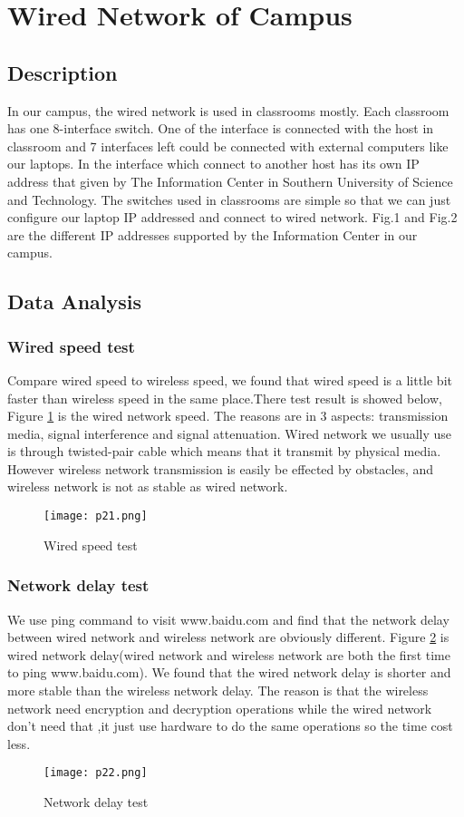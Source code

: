 \documentclass[paper=a4, fontsize=11pt]{scrartcl}
\numberwithin{equation}{section}
\numberwithin{figure}{section}
\numberwithin{table}{section}
\begin{document}
\section{Wired Network of Campus}
\subsection{Description}
In our campus, the wired network is used in classrooms mostly. Each classroom has one 8-interface switch. One of the interface is connected with the host in classroom and 7 interfaces left could be connected with external computers like our laptops. In the interface which connect to another host has its own IP address that given by The Information Center in Southern University of Science and Technology. The switches used in classrooms are simple so that we can just configure our laptop IP addressed and connect to wired network. Fig.1 and Fig.2 are the different IP addresses supported by the Information Center in our campus.
\subsection{Data Analysis}
\subsubsection{Wired speed test}
Compare wired speed to wireless speed, we found that wired speed is a little bit faster than wireless speed in the same place.There test result is showed below, Figure \ref{p21} is the wired network speed. The reasons are in 3 aspects: transmission media, signal interference and signal attenuation. Wired network we usually use is through twisted-pair cable which means that it transmit by physical media. However wireless network transmission is easily be effected by obstacles, and wireless network is not as stable as wired network.
\begin{figure}[!htb]
\centering
\texttt{[image: p21.png]}
\caption{Wired speed test}
\label{p21}
\end{figure}
\subsubsection{Network delay test}
We use ping command to visit www.baidu.com and find that the network delay between wired network and wireless network are obviously different. Figure \ref{p22} is wired network delay(wired network and wireless network are both the first time to ping www.baidu.com). We found that the wired network delay is shorter and more stable than the wireless network delay. The reason is that the wireless network need encryption and decryption operations while the wired network don't need that ,it just use hardware to do the same operations so the time cost less.
\begin{figure}[!htb]
\centering
\texttt{[image: p22.png]}
\caption{Network delay test}
\label{p22}
\end{figure}
\end{document}
